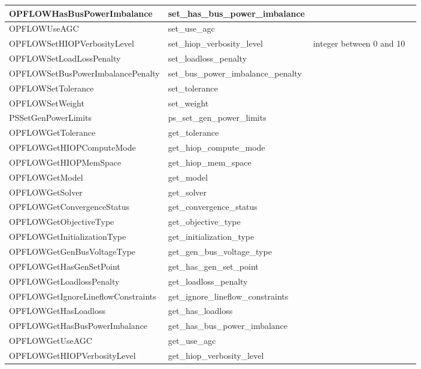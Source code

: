 {\begin{longtable}{|>{\ttfamily}p{}|>{\ttfamily}p{}|p{}|}
    \hline
    OPFLOWHasBusPowerImbalance & set\_has\_bus\_power\_imbalance & ~\\
    \hline
    OPFLOWUseAGC & set\_use\_agc & ~\\
    \hline
    OPFLOWSetHIOPVerbosityLevel & set\_hiop\_verbosity\_level & integer between 0 and 10 ~\\
    \hline
    OPFLOWSetLoadLossPenalty & set\_loadloss\_penalty & ~\\
    \hline
    OPFLOWSetBusPowerImbalancePenalty & set\_bus\_power\_imbalance\_penalty & ~\\
    \hline
    OPFLOWSetTolerance & set\_tolerance & ~\\
    \hline
    OPFLOWSetWeight & set\_weight & ~\\
    \hline
    PSSetGenPowerLimits & ps\_set\_gen\_power\_limits & ~\\
    \hline
    OPFLOWGetTolerance & get\_tolerance & ~\\
    \hline
    OPFLOWGetHIOPComputeMode & get\_hiop\_compute\_mode & ~\\
    \hline
    OPFLOWGetHIOPMemSpace & get\_hiop\_mem\_space & ~\\
    \hline
    OPFLOWGetModel & get\_model & ~\\
    \hline
    OPFLOWGetSolver & get\_solver & ~\\
    \hline
    OPFLOWGetConvergenceStatus & get\_convergence\_status & ~\\
    \hline
    OPFLOWGetObjectiveType & get\_objective\_type & ~\\
    \hline
    OPFLOWGetInitializationType & get\_initialization\_type & ~\\
    \hline
    OPFLOWGetGenBusVoltageType & get\_gen\_bus\_voltage\_type & ~\\
    \hline
    OPFLOWGetHasGenSetPoint & get\_has\_gen\_set\_point & ~\\
    \hline
    OPFLOWGetLoadlossPenalty & get\_loadloss\_penalty & ~\\
    \hline
    OPFLOWGetIgnoreLineflowConstraints & get\_ignore\_lineflow\_constraints & ~\\
    \hline
    OPFLOWGetHasLoadloss & get\_has\_loadloss & ~\\
    \hline
    OPFLOWGetHasBusPowerImbalance & get\_has\_bus\_power\_imbalance & ~\\
    \hline
    OPFLOWGetUseAGC & get\_use\_agc & ~\\
    \hline
    OPFLOWGetHIOPVerbosityLevel & get\_hiop\_verbosity\_level & ~\\

\end{longtable}}
